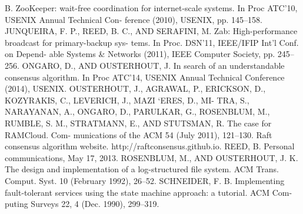 \begin{thebibliography}{99}
    B. ZooKeeper: wait-free coordination for internet-scale
    systems. In Proc ATC’10, USENIX Annual Technical Con-
    ference (2010), USENIX, pp. 145–158.
    JUNQUEIRA, F. P., REED, B. C., AND SERAFINI, M.
    Zab: High-performance broadcast for primary-backup sys-
    tems. In Proc. DSN’11, IEEE/IFIP Int’l Conf. on Depend-
    able Systems \& Networks (2011), IEEE Computer Society,
    pp. 245–256.
    ONGARO, D., AND OUSTERHOUT, J. In search of an
    understandable consensus algorithm. In Proc ATC’14,
    USENIX Annual Technical Conference (2014), USENIX.
    OUSTERHOUT, J., AGRAWAL, P., ERICKSON, D.,
    KOZYRAKIS, C., LEVERICH, J., MAZI `ERES, D., MI-
    TRA, S., NARAYANAN, A., ONGARO, D., PARULKAR,
    G., ROSENBLUM, M., RUMBLE, S. M., STRATMANN,
    E., AND STUTSMAN, R. The case for RAMCloud. Com-
    munications of the ACM 54 (July 2011), 121–130.
    Raft consensus algorithm website.
    http://raftconsensus.github.io.
    REED, B. Personal communications, May 17, 2013.
    ROSENBLUM, M., AND OUSTERHOUT, J. K. The design
    and implementation of a log-structured ﬁle system. ACM
    Trans. Comput. Syst. 10 (February 1992), 26–52.
    SCHNEIDER, F. B. Implementing fault-tolerant services
    using the state machine approach: a tutorial. ACM Com-
    puting Surveys 22, 4 (Dec. 1990), 299–319.







\end{thebibliography}